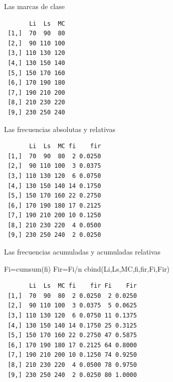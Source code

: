 \documentclass[
  ignorenonframetext,
  aspectratio=169,
  spanish,
]{beamer}
\newenvironment{Shaded}{\begin{snugshade}}{\end{snugshade}}
\newcommand{\FunctionTok}[1]{\textcolor[rgb]{0.28,0.35,0.67}{#1}}
\newcommand{\NormalTok}[1]{\textcolor[rgb]{0.00,0.23,0.31}{#1}}
\newcommand{\OtherTok}[1]{\textcolor[rgb]{0.00,0.23,0.31}{#1}}
\newcommand{\SpecialCharTok}[1]{\textcolor[rgb]{0.37,0.37,0.37}{#1}}
\begin{document}
\begin{frame}[fragile]{Las marcas de clase}
\label{las-marcas-de-clase}
\begin{Shaded}
\end{Shaded}

\begin{verbatim}
       Li  Ls  MC
 [1,]  70  90  80
 [2,]  90 110 100
 [3,] 110 130 120
 [4,] 130 150 140
 [5,] 150 170 160
 [6,] 170 190 180
 [7,] 190 210 200
 [8,] 210 230 220
 [9,] 230 250 240
\end{verbatim}
\end{frame}

\begin{frame}[fragile]{Las frecuencias absolutas y relativas}
\label{las-frecuencias-absolutas-y-relativas}
\begin{Shaded}
\end{Shaded}

\begin{verbatim}
       Li  Ls  MC fi    fir
 [1,]  70  90  80  2 0.0250
 [2,]  90 110 100  3 0.0375
 [3,] 110 130 120  6 0.0750
 [4,] 130 150 140 14 0.1750
 [5,] 150 170 160 22 0.2750
 [6,] 170 190 180 17 0.2125
 [7,] 190 210 200 10 0.1250
 [8,] 210 230 220  4 0.0500
 [9,] 230 250 240  2 0.0250
\end{verbatim}
\end{frame}

\begin{frame}[fragile]{Las frecuencias acumuladas y acumuladas
relativas}
\label{las-frecuencias-acumuladas-y-acumuladas-relativas}
\begin{Shaded}
\begin{Highlighting}[]
\NormalTok{Fi}\OtherTok{=}\FunctionTok{cumsum}\NormalTok{(fi)}
\NormalTok{Fir}\OtherTok{=}\NormalTok{Fi}\SpecialCharTok{/}\NormalTok{n}
\FunctionTok{cbind}\NormalTok{(Li,Ls,MC,fi,fir,Fi,Fir) }
\end{Highlighting}
\end{Shaded}

\begin{verbatim}
       Li  Ls  MC fi    fir Fi    Fir
 [1,]  70  90  80  2 0.0250  2 0.0250
 [2,]  90 110 100  3 0.0375  5 0.0625
 [3,] 110 130 120  6 0.0750 11 0.1375
 [4,] 130 150 140 14 0.1750 25 0.3125
 [5,] 150 170 160 22 0.2750 47 0.5875
 [6,] 170 190 180 17 0.2125 64 0.8000
 [7,] 190 210 200 10 0.1250 74 0.9250
 [8,] 210 230 220  4 0.0500 78 0.9750
 [9,] 230 250 240  2 0.0250 80 1.0000
\end{verbatim}
\end{frame}
\end{document}
